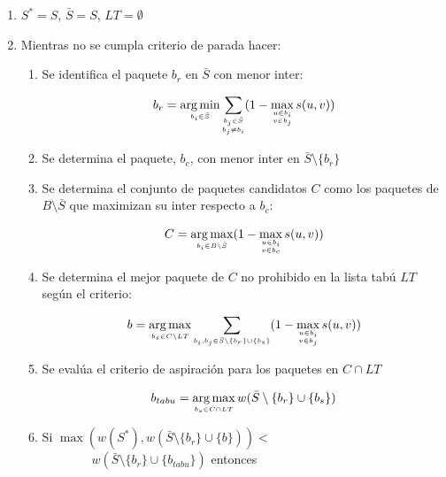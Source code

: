 \begin{enumerate}
\item $S^* = S$, $ \bar{S}= S$, $LT = \emptyset$

\item Mientras no se cumpla criterio de parada hacer:

\begin{enumerate}
      	
\item Se identifica el paquete $b_r$ en $\bar{S}$ con menor inter:

$$b_r = \operatorname*{arg\,min}_{\scriptscriptstyle b_i \in \bar{S}} \sum_{\substack{\scriptscriptstyle  b_j \in \bar{S} \\ \scriptscriptstyle  b_j \ne b_i}} (1-\max_{\substack{\scriptscriptstyle  u\in b_i \\ \scriptscriptstyle v \in b_j}} s(u,v))$$

\item Se determina el paquete, $b_c$, con menor inter en $\bar{S} \setminus \{b_r\}$

\item Se determina el conjunto de paquetes candidatos $C$ como los paquetes de $B\setminus \bar{S}$ que maximizan su inter respecto a $b_c$:

$$C = \operatorname*{arg\,max}_{\scriptscriptstyle b_i \in B \setminus \bar{S}} (1-\max_{\substack{\scriptscriptstyle u\in b_i \\ \scriptscriptstyle v \in b_c}} s(u,v))$$

\item Se determina el mejor paquete de $C$ no prohibido en la lista tabú $LT$ según el criterio:

$$b = \operatorname*{arg\,max}_{\scriptscriptstyle b_s \in C \setminus LT} \sum_{\scriptscriptstyle b_i, b_j \in \bar{S}\setminus \{b_r\} \cup \{b_s\}}(1-\max_{\substack{\scriptscriptstyle u\in b_i \\ \scriptscriptstyle v \in b_j}} s(u,v))$$

\item Se evalúa el criterio de aspiración para los paquetes en $C \cap LT$

$$b_{tabu} = \operatorname*{arg\,max}_{\scriptscriptstyle b_s \in C \cap LT} w(\bar{S} \setminus \{b_r\} \cup \{b_s\})$$

\item Si $\max(w(S^*),w(\bar{S} \setminus \{b_r\} \cup \{b\})) < \qquad \qquad$ $\qquad \qquad w(\bar{S} \setminus \{b_r\} \cup \{b_{tabu}\})$ entonces



\end{enumerate}
\end{enumerate}
